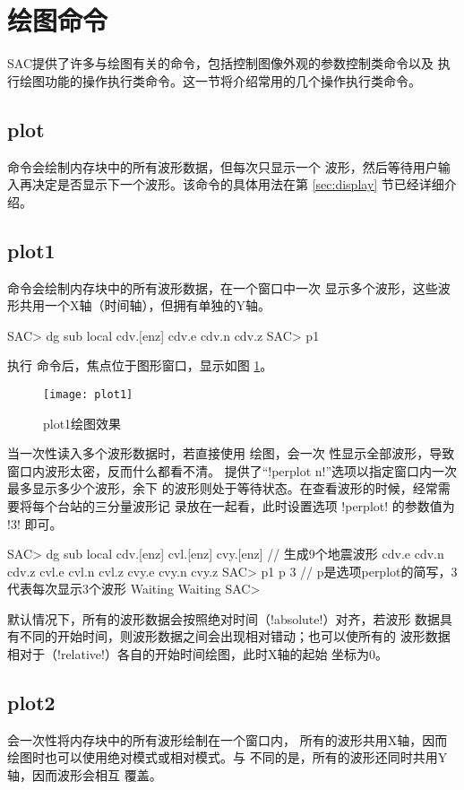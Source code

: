 \section{绘图命令}
SAC提供了许多与绘图有关的命令，包括控制图像外观的参数控制类命令以及
执行绘图功能的操作执行类命令。这一节将介绍常用的几个操作执行类命令。

\subsection{plot}
 命令会绘制内存块中的所有波形数据，但每次只显示一个
波形，然后等待用户输入再决定是否显示下一个波形。该命令的具体用法在第
\ref{sec:display} 节已经详细介绍。

\subsection{plot1}
 命令会绘制内存块中的所有波形数据，在一个窗口中一次
显示多个波形，这些波形共用一个X轴（时间轴），但拥有单独的Y轴。

\begin{SACCode}
SAC> dg sub local cdv.[enz]
cdv.e cdv.n cdv.z
SAC> p1
\end{SACCode}

执行  命令后，焦点位于图形窗口，显示如图 \ref{fig:plot1}。
\begin{figure}[H]
\centering
\texttt{[image: plot1]}
\caption{plot1绘图效果}
\label{fig:plot1}
\end{figure}

当一次性读入多个波形数据时，若直接使用  绘图，会一次
性显示全部波形，导致窗口内波形太密，反而什么都看不清。
提供了``!perplot n!''选项以指定窗口内一次最多显示多少个波形，余下
的波形则处于等待状态。在查看波形的时候，经常需要将每个台站的三分量波形记
录放在一起看，此时设置选项 !perplot! 的参数值为 !3! 即可。
\begin{SACCode}
SAC> dg sub local cdv.[enz] cvl.[enz] cvy.[enz]  // 生成9个地震波形
cdv.e cdv.n cdv.z cvl.e cvl.n cvl.z cvy.e cvy.n cvy.z
SAC> p1 p 3         // p是选项perplot的简写，3代表每次显示3个波形
Waiting
Waiting
SAC>
\end{SACCode}

默认情况下，所有的波形数据会按照绝对时间（!absolute!）对齐，若波形
数据具有不同的开始时间，则波形数据之间会出现相对错动；也可以使所有的
波形数据相对于（!relative!）各自的开始时间绘图，此时X轴的起始
坐标为0。

\subsection{plot2}
 会一次性将内存块中的所有波形绘制在一个窗口内，
所有的波形共用X轴，因而绘图时也可以使用绝对模式或相对模式。与
 不同的是，所有的波形还同时共用Y轴，因而波形会相互
覆盖。


